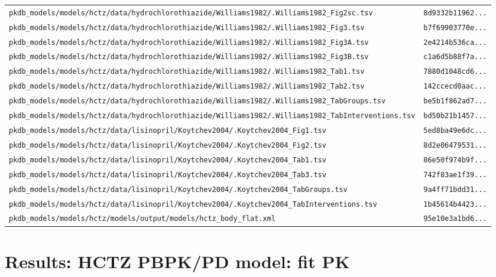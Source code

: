 \documentclass{article}
\begin{document}
\begin{longtable}{ll}
\texttt{pkdb\_models/models/hctz/data/hydrochlorothiazide/Williams1982/.Williams1982\_Fig2sc.tsv} & \texttt{8d9332b11962...} \\
\texttt{pkdb\_models/models/hctz/data/hydrochlorothiazide/Williams1982/.Williams1982\_Fig3.tsv} & \texttt{b7f69903770e...} \\
\texttt{pkdb\_models/models/hctz/data/hydrochlorothiazide/Williams1982/.Williams1982\_Fig3A.tsv} & \texttt{2e4214b536ca...} \\
\texttt{pkdb\_models/models/hctz/data/hydrochlorothiazide/Williams1982/.Williams1982\_Fig3B.tsv} & \texttt{c1a6d5b88f7a...} \\
\texttt{pkdb\_models/models/hctz/data/hydrochlorothiazide/Williams1982/.Williams1982\_Tab1.tsv} & \texttt{7880d1048cd6...} \\
\texttt{pkdb\_models/models/hctz/data/hydrochlorothiazide/Williams1982/.Williams1982\_Tab2.tsv} & \texttt{142ccecd0aac...} \\
\texttt{pkdb\_models/models/hctz/data/hydrochlorothiazide/Williams1982/.Williams1982\_TabGroups.tsv} & \texttt{be5b1f862ad7...} \\
\texttt{pkdb\_models/models/hctz/data/hydrochlorothiazide/Williams1982/.Williams1982\_TabInterventions.tsv} & \texttt{bd50b21b1457...} \\
\texttt{pkdb\_models/models/hctz/data/lisinopril/Koytchev2004/.Koytchev2004\_Fig1.tsv} & \texttt{5ed8ba49e6dc...} \\
\texttt{pkdb\_models/models/hctz/data/lisinopril/Koytchev2004/.Koytchev2004\_Fig2.tsv} & \texttt{8d2e06479531...} \\
\texttt{pkdb\_models/models/hctz/data/lisinopril/Koytchev2004/.Koytchev2004\_Tab1.tsv} & \texttt{86e50f974b9f...} \\
\texttt{pkdb\_models/models/hctz/data/lisinopril/Koytchev2004/.Koytchev2004\_Tab3.tsv} & \texttt{742f83ae1f39...} \\
\texttt{pkdb\_models/models/hctz/data/lisinopril/Koytchev2004/.Koytchev2004\_TabGroups.tsv} & \texttt{9a4ff71bdd31...} \\
\texttt{pkdb\_models/models/hctz/data/lisinopril/Koytchev2004/.Koytchev2004\_TabInterventions.tsv} & \texttt{1b45614b4423...} \\
\texttt{pkdb\_models/models/hctz/models/output/models/hctz\_body\_flat.xml} & \texttt{95e10e3a1bd6...} \\
\end{longtable}

\section{Results: HCTZ PBPK/PD model: fit PK}
\end{document}
